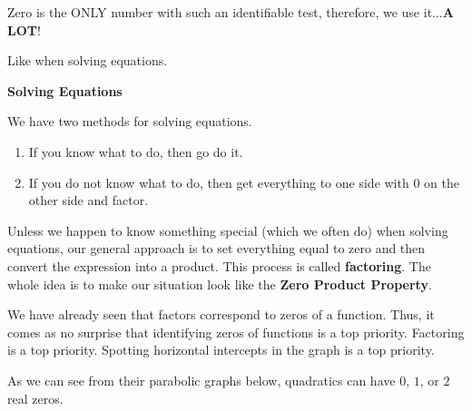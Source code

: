 \documentclass{ximera}
\begin{document}
Zero is the ONLY number with such an identifiable test, therefore, we use it...\textbf{\textcolor{purple!85!blue}{A LOT}}!   

Like when solving equations. 


\begin{procedure}  \textbf{\textcolor{purple!30!blue}{Solving Equations}}

We have two methods for solving equations.

\begin{enumerate}
     \item If you know what to do, then go do it. 
     \item If you do not know what to do, then get everything to one side with $0$ on the other side and factor.
\end{enumerate}


Unless we happen to know something special (which we often do) when solving equations, our general approach is to set everything equal to zero and then convert the expression into a product.  This process is called \textbf{factoring}.  The whole idea is to make our situation look like the \textbf{Zero Product Property}.

\end{procedure}






We have already seen that factors correspond to zeros of a function. Thus, it comes as no surprise that identifying zeros of functions is a top priority.  Factoring is a top priority. Spotting horizontal intercepts in the graph is a top priority.

As we can see from their parabolic graphs below, quadratics can have $0$, $1$, or $2$ real zeros.  
\end{document}
